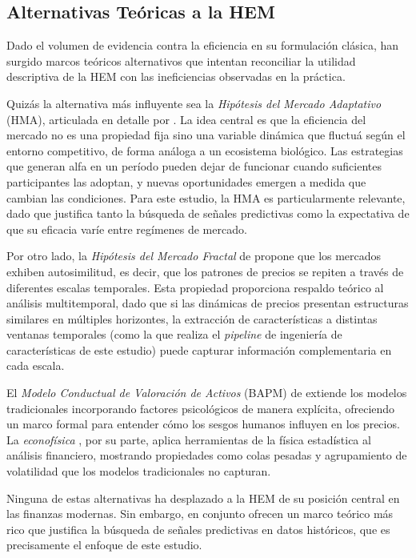 ﻿\documentclass[11pt,a4paper]{article}
\begin{document}
\subsection{Alternativas Te\'oricas a la HEM}

Dado el volumen de evidencia contra la eficiencia en su formulaci\'on cl\'asica, han surgido marcos te\'oricos alternativos que intentan reconciliar la utilidad descriptiva de la HEM con las ineficiencias observadas en la pr\'actica.

Quiz\'as la alternativa m\'as influyente sea la \textit{Hip\'otesis del Mercado Adaptativo} (HMA), articulada en detalle por \citet{lo2019}. La idea central es que la eficiencia del mercado no es una propiedad fija sino una variable din\'amica que fluctu\'a seg\'un el entorno competitivo, de forma an\'aloga a un ecosistema biol\'ogico. Las estrategias que generan alfa en un per\'iodo pueden dejar de funcionar cuando suficientes participantes las adoptan, y nuevas oportunidades emergen a medida que cambian las condiciones. Para este estudio, la HMA es particularmente relevante, dado que justifica tanto la b\'usqueda de se\~nales predictivas como la expectativa de que su eficacia var\'ie entre reg\'imenes de mercado.

Por otro lado, la \textit{Hip\'otesis del Mercado Fractal} de \citet{peters1994} propone que los mercados exhiben autosimilitud, es decir, que los patrones de precios se repiten a trav\'es de diferentes escalas temporales. Esta propiedad proporciona respaldo te\'orico al an\'alisis multitemporal, dado que si las din\'amicas de precios presentan estructuras similares en m\'ultiples horizontes, la extracci\'on de caracter\'isticas a distintas ventanas temporales (como la que realiza el \textit{pipeline} de ingenier\'ia de caracter\'isticas de este estudio) puede capturar informaci\'on complementaria en cada escala.

El \textit{Modelo Conductual de Valoraci\'on de Activos} (BAPM) de \citet{shefrin1994} extiende los modelos tradicionales incorporando factores psicol\'ogicos de manera expl\'icita, ofreciendo un marco formal para entender c\'omo los sesgos humanos influyen en los precios. La \textit{econof\'isica} \citep{mantegna2000}, por su parte, aplica herramientas de la f\'isica estad\'istica al an\'alisis financiero, mostrando propiedades como colas pesadas y agrupamiento de volatilidad que los modelos tradicionales no capturan.

Ninguna de estas alternativas ha desplazado a la HEM de su posici\'on central en las finanzas modernas. Sin embargo, en conjunto ofrecen un marco te\'orico m\'as rico que justifica la b\'usqueda de se\~nales predictivas en datos hist\'oricos, que es precisamente el enfoque de este estudio.
\end{document}
